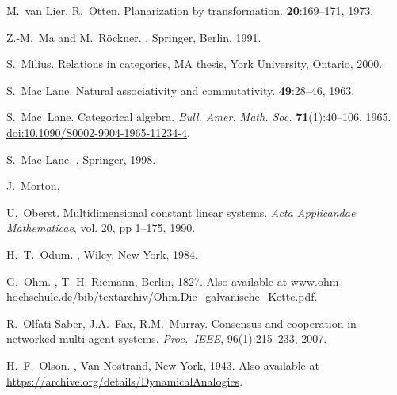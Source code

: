 \begin{thebibliography}{RSW00}
    M.\ van Lier, R.\ Otten.
    \newblock Planarization by transformation.
     {\bf 20}:169--171, 1973.

    Z.-M.\ Ma and M.\ R\"ockner.
    , Springer, Berlin, 1991.

    S.\ Milius.
    \newblock Relations in categories, MA thesis, York University,
    Ontario, 2000.

    S.\ Mac Lane.
    \newblock Natural associativity and commutativity.
     {\bf 49}:28--46, 1963. 

    S.\ Mac\ Lane.
    \newblock Categorical algebra.
    \newblock \emph{Bull. Amer. Math. Soc.} {\bf 71}(1):40--106, 1965.
    \newblock 
    \href{http://doi.org/10.1090/S0002-9904-1965-11234-4}{doi:10.1090/S0002-9904-1965-11234-4}.

    S.\ Mac Lane.
    ,
    Springer, 1998.

     J.\ Morton, 

    U.\ Oberst.
    \newblock Multidimensional constant linear systems.
    \newblock \emph{Acta Applicandae Mathematicae}, vol. 20, pp 1--175, 1990.

    H.\ T.\ Odum.
    , Wiley, New York, 1984.

    G.\ Ohm.
    ,
    T. H. Riemann, Berlin, 1827.
    \newblock Also available at
    \href{http://www.ohm-hochschule.de/bib/textarchiv/Ohm.Die_galvanische_Kette.pdf}{www.ohm-hochschule.de/bib/textarchiv/Ohm.Die\_galvanische\_Kette.pdf}.

    R.\ Olfati-Saber, J.A.\ Fax, R.M.\ Murray.
    \newblock Consensus and cooperation in networked multi-agent systems.
    \newblock \emph{Proc.\ IEEE}, 96(1):215--233, 2007.

    H.\ F.\ Olson.
    , Van
    Nostrand, New York, 1943.
    \newblock Also available at 
    \href{https://archive.org/details/DynamicalAnalogies}
    {https://archive.org/details/DynamicalAnalogies}.


\end{thebibliography}
